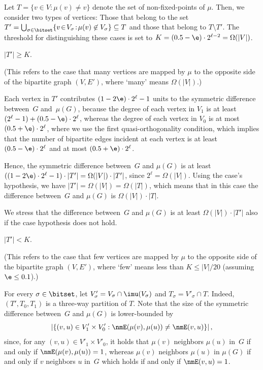 Let $T=\{v\!\in\!V\!:\!\mu(v)\neq v\}$ denote
the set of non-fixed-points of $\mu$.
Then, we consider two types of vertices:
Those that belong to the set
$T'=\bigcup_{\sigma\in\bitset}
  \{v\!\in\!V_\sigma\!:\!\mu(v)\not\in V_{\sigma}\}\subseteq T$
and those that belong to $T\setminus T'$.
The threshold for distinguishing these cases is set
to $K=(0.5-\e)\cdot2^{\ell-2}=\Omega(|V|)$.
%
%

\BDes
%
\item[{\em Case 1}:] $|T'|\geq K$.

(This refers to the case that many vertices are mapped by $\mu$
to the opposite side of the bipartite graph $(V,E')$,
where `many' means $\Omega(|V|)$.)

Each vertex in $T'$ contributes $(1-2\e)\cdot2^\ell-1$
units to the symmetric difference between~$G$ and~$\mu(G)$,
because the degree of each vertex in $V_1$
is at least $(2^{\ell}-1)+(0.5-\e)\cdot2^\ell$,
whereas the degree of each vertex in $V_0$
is at most $(0.5+\e)\cdot2^\ell$,
where we use the first quasi-orthogonality condition,
which implies that the number of bipartite edges incident
at each vertex is at least $(0.5-\e)\cdot2^\ell$
and at most $(0.5+\e)\cdot2^\ell$.

Hence, the symmetric difference between~$G$ and $\mu(G)$ is at least
$((1-2\e)\cdot2^\ell-1)\cdot|T'|=\Omega(|V|)\cdot|T'|$,
since $2^\ell=\Omega(|V|)$.
Using the case's hypothesis,
we have $|T'|=\Omega(|V|)=\Omega(|T|)$,
which means that in this case
the difference between~$G$ and $\mu(G)$ is $\Omega(|V|)\cdot|T|$.

We stress that the difference between~$G$ and $\mu(G)$
is at least $\Omega(|V|)\cdot|T'|$
also if the case hypothesis does not hold.

%
\item[{\em Case 2}:] $|T'|<K$.

(This refers to the case that few vertices are mapped by $\mu$
to the opposite side of the bipartite graph $(V,E')$,
where `few' means less than $K\leq|V|/20$ (assuming $\e\leq0.1$).)

For every $\sigma\in\bitset$,
let $V'_\sigma=V_\sigma\cap\imu(V_\sigma)$ and $T_\sigma=V'_\sigma\cap T$.
%
Indeed, $(T',T_0,T_1)$ is a three-way partition of $T$.
%
%
Note that the size of the symmetric difference between~$G$ and $\mu(G)$
is lower-bounded by
\begin{equation}\label{diff-vs-nmE:eq}
\left|\{(v,u)\in V'_1\times V'_0:\nmE(\mu(v),\mu(u))\neq\nmE(v,u)\}\right|,
\end{equation}
since, for any $(v,u)\in V'_1\times V'_0$,
it holds that $\mu(v)$ neighbors $\mu(u)$ in~$G$
if and only if $\nmE(\mu(v),\allowbreak\mu(u))=1$,
whereas $\mu(v)$ neighbors $\mu(u)$ in $\mu(G)$
if and only if $v$ neighbors $u$ in~$G$
which holds if and only if $\nmE(v,u)=1$.
%
%
%
%
%
%
%
%
%
%
%


